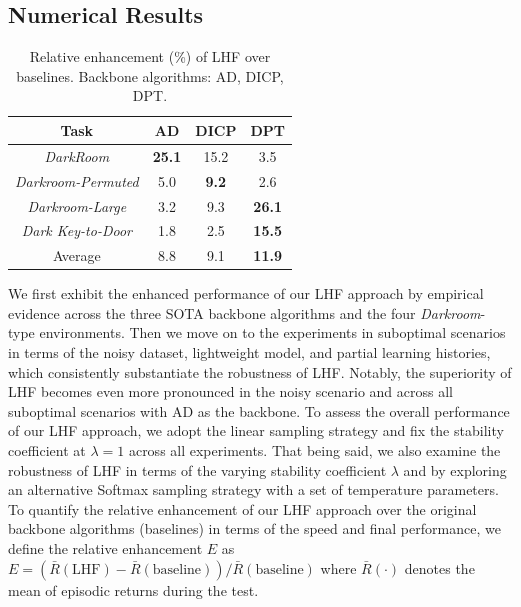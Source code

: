 \documentclass{article}
\begin{document}
\subsection{Numerical Results}
\label{exp_numerical_result}
\begin{table}
    \centering
    \caption{Relative enhancement (\%) of LHF over baselines. Backbone algorithms: AD, DICP, DPT.}
    \label{tab_darkrooms_OriginaData_FullHistory}
    \begin{tabular}{cccc}
        \toprule
        Task & AD & DICP & DPT \\
        \midrule
        \textit{DarkRoom} & \textbf{25.1} & 15.2 & 3.5 \\
        \textit{Darkroom-Permuted} & 5.0 & \textbf{9.2} & 2.6 \\
        \textit{Darkroom-Large} & 3.2 & 9.3 & \textbf{26.1} \\
        \textit{Dark Key-to-Door} & 1.8 & 2.5 & \textbf{15.5} \\
        \midrule
        Average & 8.8 & 9.1 & \textbf{11.9} \\
        \bottomrule
    \end{tabular}
    \vspace{-5pt}
\end{table}
We first exhibit the enhanced performance of our LHF approach by empirical evidence across the three SOTA backbone algorithms and the four \textit{Darkroom}-type environments. Then we move on to the experiments in suboptimal scenarios in terms of the noisy dataset, lightweight model, and partial learning histories, which consistently substantiate the robustness of LHF. Notably, the superiority of LHF becomes even more pronounced in the noisy scenario and across all suboptimal scenarios with AD as the backbone.
To assess the overall performance of our LHF approach, we adopt the linear sampling strategy and fix the stability coefficient at $\lambda = 1$ across all experiments. That being said, we also examine the robustness of LHF in terms of the varying stability coefficient $\lambda$ and by exploring an alternative Softmax sampling strategy with a set of temperature parameters.
To quantify the relative enhancement of our LHF approach over the original backbone algorithms (baselines) in terms of the speed and final performance, we define the relative enhancement $E$ as $E = (\bar{R}(\text{LHF}) - \bar{R}(\text{baseline})) / \bar{R}(\text{baseline})$ where $\bar{R}(\cdot)$ denotes the mean of episodic returns during the test.
\end{document}
